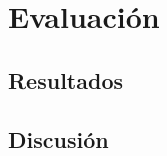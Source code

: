 \documentclass[11pt,a4paper,spanish]{book}
\numberwithin{equation}{chapter}
\numberwithin{figure}{chapter}
\numberwithin{table}{chapter}
\begin{document}
\chapter{Evaluación}
%
%
%

\section{Resultados}

\section{Discusión}
\end{document}
